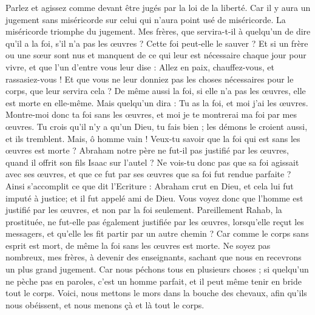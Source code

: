 \begin{multicols}{2}
Parlez et agissez comme devant être jugés par la loi de la liberté.
Car il y aura un jugement sans miséricorde sur celui qui n’aura point usé de miséricorde. La miséricorde triomphe du jugement.
Mes frères, que servira-t-il à quelqu’un de dire qu'il a la foi, s’il n’a pas les œuvres ? Cette foi peut-elle le sauver ?
Et si un frère ou une sœur sont nus et manquent de ce qui leur est nécessaire chaque jour pour vivre,
et que l’un d'entre vous leur dise : Allez en paix, chauffez-vous, et rassasiez-vous ! Et que vous ne leur donniez pas les choses nécessaires pour le corps, que leur servira cela ?
De même aussi la foi, si elle n'a pas les œuvres, elle est morte en elle-même.
Mais quelqu'un dira : Tu as la foi, et moi j'ai les œuvres. Montre-moi donc ta foi sans les œuvres, et moi je te montrerai ma foi par mes œuvres.
Tu crois qu'il n'y a qu'un Dieu, tu fais bien ; les démons le croient aussi, et ils tremblent.
Mais, ô homme vain ! Veux-tu savoir que la foi qui est sans les œuvres est morte ?
Abraham notre père ne fut-il pas justifié par les œuvres, quand il offrit son fils Isaac sur l'autel ?
Ne vois-tu donc pas que sa foi agissait avec ses œuvres, et que ce fut par ses œuvres que sa foi fut rendue parfaite ?
Ainsi s’accomplit ce que dit l’Ecriture : Abraham crut en Dieu, et cela lui fut imputé à justice; et il fut appelé ami de Dieu.
Vous voyez donc que l'homme est justifié par les œuvres, et non par la foi seulement.
Pareillement Rahab, la prostituée, ne fut-elle pas également justifiée par les œuvres, lorsqu’elle reçut les messagers, et qu'elle les fit partir par un autre chemin ?
Car comme le corps sans esprit est mort, de même la foi sans les œuvres est morte.
\VerseOne{}Ne soyez pas nombreux, mes frères, à devenir des enseignants, sachant que nous en recevrons un plus grand jugement.
Car nous péchons tous en plusieurs choses ; si quelqu’un ne pèche pas en paroles, c’est un homme parfait, et il peut même tenir en bride tout le corps.
Voici, nous mettons le mors dans la bouche des chevaux, afin qu’ils nous obéissent, et nous menons çà et là tout le corps.

\end{multicols}
